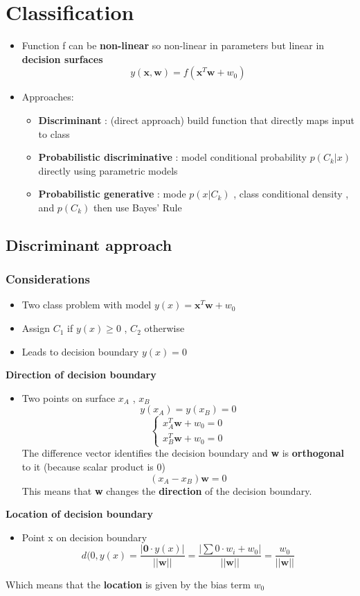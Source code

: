 \documentclass[12pt]{article} %
\begin{document}
\section{Classification}
\begin{itemize}
\item Function f can be \textbf{non-linear} so non-linear in parameters but linear in \textbf{decision surfaces}
 $$ y(\bm{x},\bm{w})= f( \bm{x}^T \bm{w} + w_0)  $$
 
\item Approaches:
\begin{itemize}
\item \textbf{Discriminant} : (direct approach) build function that directly maps input to class
\item \textbf{Probabilistic discriminative} : model conditional probability $p(C_k|x)$ directly using parametric models
\item \textbf{Probabilistic generative} : mode $p(x|C_k)$ , class conditional density , and $p(C_k)$ then use Bayes' Rule
\end{itemize}
\end{itemize}

\subsection{Discriminant approach}

\subsubsection{Considerations}
\begin{itemize}
\item Two class problem with model $y(x) = \bm{x}^T \bm{w} + w_0$
\item Assign $C_1$ if $y(x) \geq 0$ , $C_2$ otherwise
\item Leads to decision boundary $y(x) = 0$  
\end{itemize}
\newpage
\textbf{Direction of decision boundary}
\begin{itemize}
\item  Two points on surface $x_A$ , $x_B$
$$ y(x_A)=y(x_B) = 0$$
$$ \begin{cases}
x_A^T \bm{w}+w_0 =0\\
x_B^T \bm{w}+w_0 =0
\end{cases}
$$
The difference vector identifies the decision boundary and \textbf{w} is \textbf{orthogonal} to it (because scalar product is 0)
$$ (x_A - x_B) \bm{w}=0$$
This means that \textbf{w} changes the \textbf{direction} of the decision boundary.
\end{itemize}
\textbf{Location of decision boundary}
\begin{itemize}
\item Point x on decision boundary 	
$$ d(0,y(x) = \frac{|\bm{0} \cdot y(x)|}{||\bm{w}||}= \frac{|\sum 0 \cdot w_i + w_0|}{||\bm{w}||} = \frac{w_0}{||\bm{w}||}$$
\end{itemize}
Which means that the \textbf{location} is given by the bias term $w_0$
\end{document}
